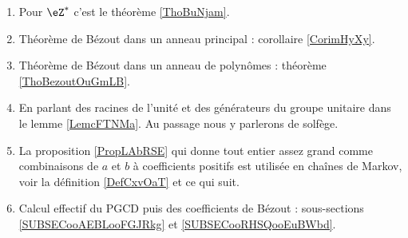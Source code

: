 

    \begin{enumerate}
        \item
            Pour \( \eZ^*\) c'est le théorème \ref{ThoBuNjam}.
        \item
            Théorème de Bézout dans un anneau principal : corollaire \ref{CorimHyXy}.
        \item
            Théorème de Bézout dans un anneau de polynômes : théorème \ref{ThoBezoutOuGmLB}.
        \item
            En parlant des racines de l'unité et des générateurs du groupe unitaire dans le lemme \ref{LemcFTNMa}. Au passage nous y parlerons de solfège.
        \item
            La proposition \ref{PropLAbRSE} qui donne tout entier assez grand comme combinaisons de \( a \) et \( b\) à coefficients positifs est utilisée en chaînes de Markov, voir la définition \ref{DefCxvOaT} et ce qui suit.
        \item
            Calcul effectif du PGCD puis des coefficients de Bézout : sous-sections \ref{SUBSECooAEBLooFGJRkg} et \ref{SUBSECooRHSQooEuBWbd}.
        \end{enumerate}

